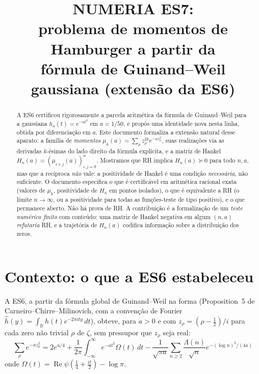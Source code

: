 \documentclass[12pt,a4paper]{article}
\title{
    NUMERIA ES7: \\
    problema de momentos de Hamburger a partir da \\
    fórmula de Guinand--Weil gaussiana (extensão da ES6)
}
\author{}
\date{}
\begin{document}
\maketitle

\begin{abstract}
A ES6 certificou rigorosamente a parcela aritmética da fórmula de
Guinand--Weil para a gaussiana $h_a(t)=e^{-at^2}$ em $a=1/50$, e propôs
uma identidade nova nesta linha, obtida por diferenciação em $a$. Este
documento formaliza a extensão natural desse aparato: a família de
\emph{momentos} $\mu_k(a) = \sum_\rho z_\rho^{2k} e^{-az_\rho^2}$,
suas realizações via as derivadas $k$-ésimas do lado direito da fórmula
explícita, e a matriz de Hankel
$H_n(a) = (\mu_{i+j}(a))_{i,j=0}^{n}$. Mostramos que RH implica
$H_n(a)\succeq 0$ para todo $n,a$, mas que a recíproca \emph{não} vale:
a positividade de Hankel é uma condição \emph{necessária}, não
suficiente. O documento especifica o que é certificável em aritmética
racional exata (valores de $\mu_k$, positividade de $H_n$ em pontos
isolados), o que é equivalente a RH (o limite $n\to\infty$, ou a
positividade para todas as funções-teste de tipo positivo), e o que
permanece aberto. Não há prova de RH. A contribuição é a formalização
de um \emph{teste numérico finito} com conteúdo: uma matriz de Hankel
negativa em algum $(n,a)$ \emph{refutaria} RH, e a trajetória de
$H_n(a)$ codifica informação sobre a distribuição dos zeros.
\end{abstract}

\tableofcontents

\section{Contexto: o que a ES6 estabeleceu}

A ES6, a partir da fórmula global de Guinand--Weil na forma
(Proposition~5 de Carneiro--Chirre--Milinovich, com a convenção de
Fourier $\widehat h(y) = \int_{\mathbb{R}} h(t)e^{-2\pi i t y}\,dt$),
obteve, para $a>0$ e com $z_\rho = (\rho-\tfrac12)/i$ para cada zero
não trivial $\rho$ de $\zeta$, sem pressupor que $z_\rho$ seja real:
\begin{equation}\label{eq:GW}
\boxed{
\sum_{\rho}e^{-az_\rho^2}
=2e^{a/4}+\frac{1}{2\pi}\int_{-\infty}^{\infty}e^{-at^2}\Omega(t)\,dt
-\frac{1}{\sqrt{\pi a}}\sum_{n\ge 2}\frac{\Lambda(n)}{\sqrt n}
e^{-(\log n)^2/(4a)}
}
\end{equation}
onde $\Omega(t) = \operatorname{Re}\psi(\tfrac14+\tfrac{it}{2})-\log\pi$.
\end{document}
